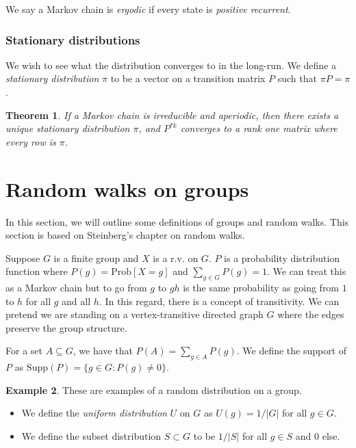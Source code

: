 \documentclass[]{article}
\newtheorem{theorem}{Theorem}
\theoremstyle{definition}
\newtheorem{example}[theorem]{Example}
\numberwithin{theorem}{section}
\numberwithin{equation}{section}
\newcommand{\supp}{\text{Supp}}
\begin{document}
We say a Markov chain is \textit{ergodic} if every state is \textit{positive recurrent}. 

\subsubsection{Stationary distributions}
We wish to see what the distribution converges to in the long-run. We define a\textit{ stationary distribution} $\pi$ to be a vector on a transition matrix $P$ such that $\pi P = \pi$. 

\begin{theorem}
	If a Markov chain is irreducible and aperiodic, then there exists a unique stationary distribution $\pi$, and $P^{*k}$ converges to a rank one matrix where every row is $\pi$. 
\end{theorem}

\section{Random walks on groups}\label{sec:defns}
In this section, we will outline some definitions of groups and random walks. This section is based on Steinberg's chapter on random walks\cite{steinbergProbabilityRandomWalks2012}.

Suppose $G$ is a finite group and $X$ is a r.v. on $G$. $P$ is a probability distribution function where $P(g) = \text{Prob}[X = g]$ and $\sum_{g\in G} P(g) = 1$. We can treat this as a Markov chain but to go from $g$ to $gh$ is the same probability as going from $1$ to $h$ for all $g$ and all $h$. 
In this regard, there is a concept of transitivity. We can pretend we are standing on a vertex-transitive directed graph $G$ where the edges preserve the group structure. 

For a set $A \subseteq G$, we have that $P(A) = \sum_{g \in A} P(g)$. We define the support of $P$ as $\supp(P) = \lbrace g \in G : P(g) \neq 0 \rbrace$. 


\begin{example}
	These are examples of a random distribution on a group. 
	\begin{itemize}
		\item We define the \textit{uniform distribution} $U$ on $G$ as $U(g) = 1/|G|$ for all $g \in G$. 
		\item We define the subset distribution $S \subset G$ to be $1/|S|$ for all $ g \in S$ and 0 else.
	\end{itemize}
\end{example}
\end{document}
